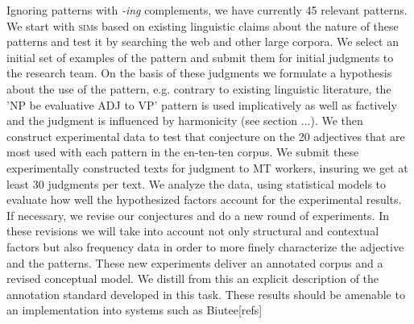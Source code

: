 \documentclass[10pt]{article}
\begin{document}
\vspace {-3mm}

Ignoring patterns with \emph{-ing} complements, we have currently 45 relevant patterns. We start with \textsc{sim}s based on existing linguistic claims about the nature of these patterns and test it by searching the web and other large corpora. We select an initial set of examples of the pattern and submit them for initial judgments to the research team. On the basis of these judgments we formulate a hypothesis about the use of the pattern, e.g. contrary to existing linguistic literature, the 'NP be evaluative ADJ to VP' pattern is used implicatively as well as factively and the judgment is influenced by harmonicity (see section ...). We then construct experimental data to test that conjecture on the 20 adjectives that are most used with each pattern in the en-ten-ten corpus. We submit these experimentally constructed texts for judgment to MT workers, insuring we get at least 30 judgments per text. We analyze the data, using statistical models to evaluate how well the hypothesized factors account for the experimental results. If necessary, we revise our conjectures and do a new round of experiments. In these revisions we will take into account not only structural and contextual factors but also frequency data in order to more finely characterize the adjective and the patterns. These new experiments deliver an annotated corpus and a revised conceptual model. We distill from this an explicit description of the annotation standard developed in this task.  These results should be amenable to an implementation into systems such as Biutee[refs] 


\end{document}
